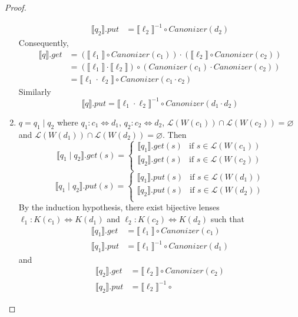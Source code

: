 \documentclass{svproc}
\newcommand{\sep}{\ensuremath{\; | \;}}
\begin{document}
\begin{proof}
\begin{enumerate}
\begin{align*}
\llbracket q_2 \rrbracket.put &= {\llbracket \ell_2 \rrbracket}^{-1} \circ
Canonizer(d_2)
\end{align*}
Consequently,
\begin{align*}
  \llbracket q \rrbracket.get &= (\llbracket \ell_1 \rrbracket \circ
Canonizer(c_1)) \cdot  (\llbracket \ell_2 \rrbracket \circ
Canonizer(c_2))\\
&= (\llbracket \ell_1 \rrbracket \cdot \llbracket \ell_2
\rrbracket) \circ (Canonizer(c_1) \cdot Canonizer(c_2))\\
&= \llbracket \ell_1 \cdot  \ell_2 \rrbracket \circ Canonizer(c_1 \cdot c_2)
\end{align*}
Similarly
$$
  \llbracket q \rrbracket.put = \llbracket \ell_1 \cdot  \ell_2 \rrbracket^{-1}
  \circ Canonizer(d_1 \cdot d_2) $$
  \item
  $q = q_1 \sep q_2$ where $q_1 : c_1 \Leftrightarrow d_1 $, $q_2 : c_2
  \Leftrightarrow d_2$, $\mathcal{L}(W(c_1)) \cap \mathcal{L}(W(c_2)) =
  \varnothing$ and $\mathcal{L}(W(d_1)) \cap \mathcal{L}(W(d_2)) = \varnothing$.
  Then
  $$
  \llbracket q_1 \sep q_2 \rrbracket.get(s) = 
  \begin{cases}
  \llbracket q_1 \rrbracket.get (s) & \text{if } s \in \mathcal{L}(W(c_1))\\
  \llbracket q_2 \rrbracket.get (s) & \text{if } s \in \mathcal{L}(W(c_2))\\
  \end{cases}$$
  $$\llbracket q_1 \sep q_2 \rrbracket.put(s) = 
  \begin{cases}
  \llbracket q_1 \rrbracket.put (s) & \text{if } s \in \mathcal{L}(W(d_1))\\
  \llbracket q_2 \rrbracket.put (s) & \text{if } s \in \mathcal{L}(W(d_2))\\
  \end{cases}
  $$
By the induction hypothesis, there exist bijective lenses $\ell_1 : K(c_1)
\Leftrightarrow K(d_1)$ and $\ell_2 : K(c_2) \Leftrightarrow K(d_2)$ such that
\begin{align*}
\llbracket q_1 \rrbracket.get &= \llbracket \ell_1 \rrbracket \circ
Canonizer(c_1)\\
\llbracket q_1 \rrbracket.put &= {\llbracket \ell_1 \rrbracket}^{-1} \circ
Canonizer(d_1)
\end{align*}
and
\begin{align*}
\llbracket q_2 \rrbracket.get &= \llbracket \ell_2 \rrbracket \circ
Canonizer(c_2)\\
\llbracket q_2 \rrbracket.put &= {\llbracket \ell_2 \rrbracket}^{-1} \circ

\end{align*}
\end{enumerate}
\end{proof}
\end{document}
